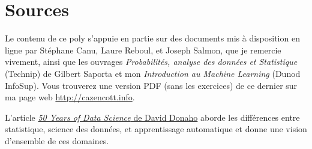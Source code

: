\section{Sources}
Le contenu de ce poly s'appuie en partie sur des documents mis à disposition en
ligne par Stéphane Canu, Laure Reboul, et Joseph Salmon, que je remercie
vivement, ainsi que les ouvrages \textit{Probabilités, analyse des données et
	Statistique} (Technip) de Gilbert Saporta et mon \textit{Introduction au
	Machine Learning} (Dunod InfoSup). Vous trouverez une version PDF (sans les
exercices) de ce dernier sur ma page web \href{http://cazencott.info}{http://cazencott.info}.


\begin{plusloin}
	\item L'article \href{https://www.tandfonline.com/doi/full/10.1080/10618600.2017.1384734}{\textit{50 Years of Data Science} de David Donaho}
	aborde les différences entre statistique, science des données, et apprentissage
	automatique et donne une vision d'ensemble de ces domaines.
\end{plusloin}

